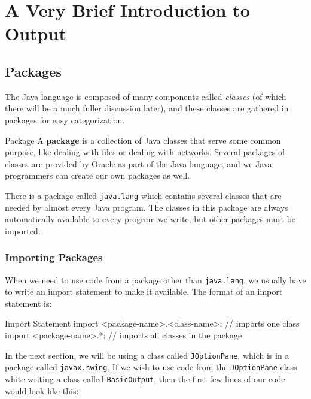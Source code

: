 
\chapter{A Very Brief Introduction to Output}

\minitoc

\section{Packages}

The Java language is composed of many components called \textit{classes} (of which there will be a much fuller discussion later), and these classes are gathered in packages for easy categorization.

\begin{defn}{Package}
A \textbf{package} is a collection of Java classes that serve some common purpose, like dealing with files or dealing with networks.  Several packages of classes are provided by Oracle as part of the Java language, and we Java programmers can create our own packages as well.
\end{defn}

There is a package called \lstinline{java.lang} which contains several classes that are needed by almost every Java program.  The classes in this package are always automatically available to every program we write, but other packages must be imported.

\subsection{Importing Packages}

When we need to use code from a package other than \lstinline{java.lang}, we usually have to write an import statement to make it available.  The format of an import statement is:

\begin{javaformat}{Import Statement}
import <package-name>.<class-name>; // imports one class
import <package-name>.*;            // imports all classes in the package
\end{javaformat}

In the next section, we will be using a class called \lstinline{JOptionPane}, which is in a package called \lstinline{javax.swing}.  If we wish to use code from the \lstinline{JOptionPane} class white writing a class called \lstinline{BasicOutput}, then the first few lines of our code would look like this:

